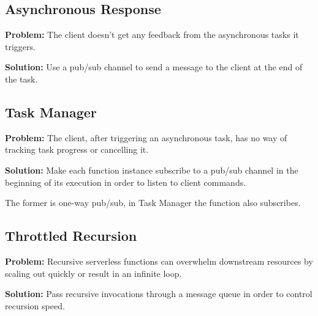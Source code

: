 \subsection{Asynchronous Response} \label{subsec:AsyncResponse}

\textbf{Problem:} The client doesn't get any feedback from the asynchronous tasks it triggers.

\textbf{Solution:} Use a pub/sub channel to send a message to the client at the end of the task.

\subsection{Task Manager} \label{subsec:taskManager}

\textbf{Problem:} The client, after triggering an asynchronous task, has no way of tracking task progress or cancelling it.

\textbf{Solution:} Make each function instance subscribe to a pub/sub channel in the beginning of its execution in order to listen to client commands.

The former is one-way pub/sub, in Task Manager the function also subscribes.

\subsection{Throttled Recursion} \label{subsec:throttledRecursion}

\textbf{Problem:} Recursive serverless functions can overwhelm downstream resources by scaling out quickly or result in an infinite loop.

\textbf{Solution:} Pass recursive invocations through a message queue in order to control recursion speed.
